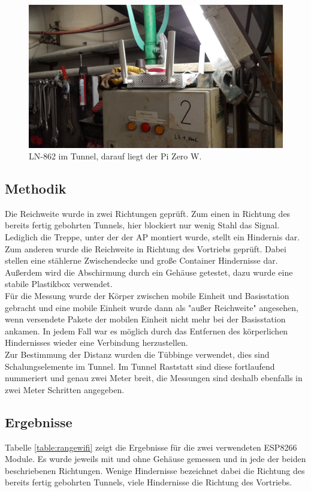 \begin{figure}[h]
  \centering
	\includegraphics[width=\textwidth]{images/applacement.jpg}
  \caption{LN-862 im Tunnel, darauf liegt der Pi Zero W.}
  \label{fig:applacement}
\end{figure}

\subsection{Methodik}
Die Reichweite wurde in zwei Richtungen geprüft.
Zum einen in Richtung des bereits fertig gebohrten Tunnels, hier blockiert nur wenig Stahl das Signal. 
Lediglich die Treppe, unter der der AP montiert wurde, stellt ein Hindernis dar.
Zum anderen wurde die Reichweite in Richtung des Vortriebs geprüft.
Dabei stellen eine stählerne Zwischendecke und große Container Hindernisse dar.\\
Außerdem wird die Abschirmung durch ein Gehäuse getestet, dazu wurde eine stabile Plastikbox verwendet.\\
Für die Messung wurde der Körper zwischen mobile Einheit und Basisstation gebracht und eine mobile Einheit wurde dann als "{}außer Reichweite"{} angesehen, wenn versendete Pakete der mobilen Einheit nicht mehr bei der Basisstation ankamen.
In jedem Fall war es möglich durch das Entfernen des körperlichen Hindernisses wieder eine Verbindung herzustellen.\\
Zur Bestimmung der Distanz wurden die Tübbinge verwendet, dies sind Schalungselemente im Tunnel.
Im Tunnel Raststatt sind diese fortlaufend nummeriert und genau zwei Meter breit, die Messungen sind deshalb ebenfalls in zwei Meter Schritten angegeben.

\subsection{Ergebnisse}
Tabelle \ref{table:rangewifi} zeigt die Ergebnisse für die zwei verwendeten ESP8266 Module.
Es wurde jeweils mit und ohne Gehäuse gemessen und in jede der beiden beschriebenen Richtungen.
Wenige Hindernisse bezeichnet dabei die Richtung des bereits fertig gebohrten Tunnels, viele Hindernisse die Richtung des Vortriebs.

